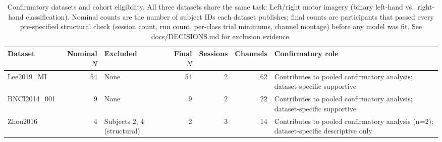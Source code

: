 \begin{table}[t]
\centering
\small
\caption{Confirmatory datasets and cohort eligibility. All three datasets share the same task: Left/right motor imagery (binary left-hand vs.\ right-hand classification). Nominal counts are the number of subject IDs each dataset publishes; final counts are participants that passed every pre-specified structural check (session count, run count, per-class trial minimums, channel montage) before any model was fit. See docs/DECISIONS.md for exclusion evidence.}
\label{tab:datasets_cohort}
\begin{tabularx}{\textwidth}{@{} l r p{2.3cm} r r r X @{}}
\toprule
Dataset & Nominal $N$ & Excluded & Final $N$ & Sessions & Channels & Confirmatory role \\
\midrule
Lee2019\_MI & 54 & None & 54 & 2 & 62 & Contributes to pooled confirmatory analysis; dataset-specific supportive \\
BNCI2014\_001 & 9 & None & 9 & 2 & 22 & Contributes to pooled confirmatory analysis; dataset-specific supportive \\
Zhou2016 & 4 & Subjects 2, 4 (structural) & 2 & 3 & 14 & Contributes to pooled confirmatory analysis (n=2); dataset-specific descriptive only \\
\bottomrule
\end{tabularx}
\end{table}
